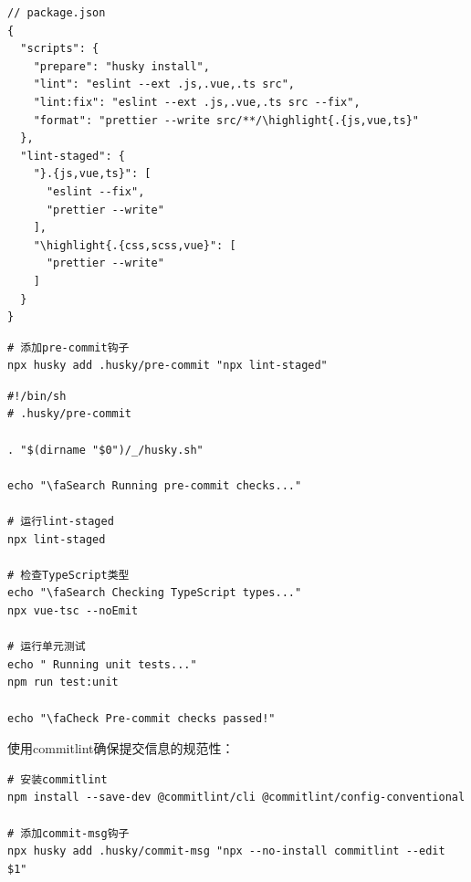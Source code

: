 \begin{lstlisting}[style=javascript]
// package.json
{
  "scripts": {
    "prepare": "husky install",
    "lint": "eslint --ext .js,.vue,.ts src",
    "lint:fix": "eslint --ext .js,.vue,.ts src --fix",
    "format": "prettier --write src/**/\highlight{.{js,vue,ts}"
  },
  "lint-staged": {
    "}.{js,vue,ts}": [
      "eslint --fix",
      "prettier --write"
    ],
    "\highlight{.{css,scss,vue}": [
      "prettier --write"
    ]
  }
}
\end{lstlisting}


\begin{lstlisting}[style=terminal]
# 添加pre-commit钩子
npx husky add .husky/pre-commit "npx lint-staged"
\end{lstlisting}

\begin{lstlisting}[style=terminal]
#!/bin/sh
# .husky/pre-commit

. "$(dirname "$0")/_/husky.sh"

echo "\faSearch Running pre-commit checks..."

# 运行lint-staged
npx lint-staged

# 检查TypeScript类型
echo "\faSearch Checking TypeScript types..."
npx vue-tsc --noEmit

# 运行单元测试
echo " Running unit tests..."
npm run test:unit

echo "\faCheck Pre-commit checks passed!"
\end{lstlisting}


使用commitlint确保提交信息的规范性：

\begin{lstlisting}[style=terminal]
# 安装commitlint
npm install --save-dev @commitlint/cli @commitlint/config-conventional

# 添加commit-msg钩子
npx husky add .husky/commit-msg "npx --no-install commitlint --edit $1"
\end{lstlisting}

